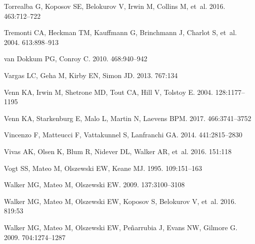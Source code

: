 \documentclass[a4paper]{ar-1col}
\begin{document}
\begin{thebibliography}{}
{Torrealba} G, {Koposov} SE, {Belokurov} V, {Irwin} M, {Collins} M, et~al.
  2016{}.
\textit{\mnras} 463:712--722

{Tremonti} CA, {Heckman} TM, {Kauffmann} G, {Brinchmann} J, {Charlot} S, et~al.
  2004.
\textit{\apj} 613:898--913

{van Dokkum} PG, {Conroy} C. 2010.
\textit{\nat} 468:940--942

{Vargas} LC, {Geha} M, {Kirby} EN, {Simon} JD. 2013.
\textit{\apj} 767:134

{Venn} KA, {Irwin} M, {Shetrone} MD, {Tout} CA, {Hill} V, {Tolstoy} E. 2004.
\textit{\aj} 128:1177--1195

{Venn} KA, {Starkenburg} E, {Malo} L, {Martin} N, {Laevens} BPM. 2017.
\textit{\mnras} 466:3741--3752

{Vincenzo} F, {Matteucci} F, {Vattakunnel} S, {Lanfranchi} GA. 2014.
\textit{\mnras} 441:2815--2830

{Vivas} AK, {Olsen} K, {Blum} R, {Nidever} DL, {Walker} AR, et~al. 2016.
\textit{\aj} 151:118

{Vogt} SS, {Mateo} M, {Olszewski} EW, {Keane} MJ. 1995.
\textit{\aj} 109:151--163

{Walker} MG, {Mateo} M, {Olszewski} EW. 2009.
\textit{\aj} 137:3100--3108

{Walker} MG, {Mateo} M, {Olszewski} EW, {Koposov} S, {Belokurov} V, et~al.
  2016.
\textit{\apj} 819:53

{Walker} MG, {Mateo} M, {Olszewski} EW, {Pe{\~n}arrubia} J, {Evans} NW,
  {Gilmore} G. 2009{}.
\textit{\apj} 704:1274--1287


\end{thebibliography}
\end{document}
